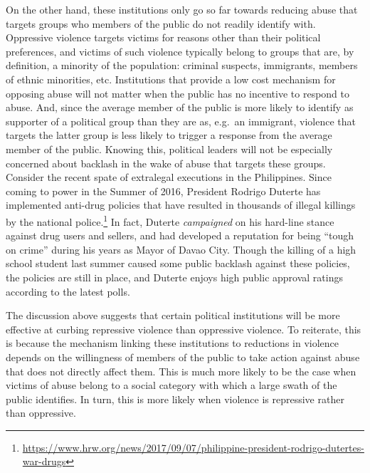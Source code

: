 \documentclass[12pt]{article}
\begin{document}
On the other hand, these institutions only go so far towards reducing abuse that targets groups who members of the public do not readily identify with. Oppressive violence targets victims for reasons other than their political preferences, and victims of such violence typically belong to groups that are, by definition, a minority of the population: criminal suspects, immigrants, members of ethnic minorities, etc. Institutions that provide a low cost mechanism for opposing abuse will not matter when the public has no incentive to respond to abuse. And, since the average member of the public is more likely to identify as supporter of a political group than they are as, e.g.\, an immigrant, violence that targets the latter group is less likely to trigger a response from the average member of the public. Knowing this, political leaders will not be especially concerned about backlash in the wake of abuse that targets these groups. Consider the recent spate of extralegal executions in the Philippines. Since coming to power in the Summer of 2016, President Rodrigo Duterte has implemented anti-drug policies that have resulted in thousands of illegal killings by the national police.\footnote{\url{https://www.hrw.org/news/2017/09/07/philippine-president-rodrigo-dutertes-war-drugs}} In fact, Duterte {\em campaigned} on his hard-line stance against drug users and sellers, and had developed a reputation for being ``tough on crime'' during his years as Mayor of Davao City. Though the killing of a high school student last summer caused some public backlash against these policies, the policies are still in place, and Duterte enjoys high public approval ratings according to the latest polls. 

The discussion above suggests that certain political institutions will be more effective at curbing repressive violence than oppressive violence. To reiterate, this is because the mechanism linking these institutions to reductions in violence depends on the willingness of members of the public to take action against abuse that does not directly affect them. This is much more likely to be the case when victims of abuse belong to a social category with which a large swath of the public identifies. In turn, this is more likely when violence is repressive rather than oppressive.    
\end{document}
